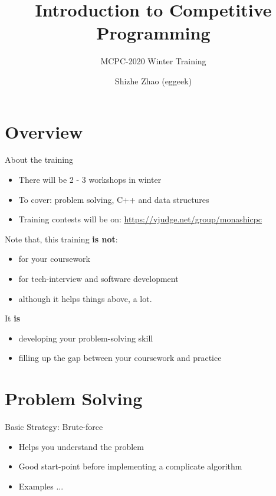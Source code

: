 \documentclass{beamer}
\title[Introduction to Competitive Programming]{
Introduction to Competitive Programming
}
\subtitle {MCPC-2020 Winter Training}
\date{}
\author[Shizhe Zhao (eggeek)]{
  Shizhe Zhao (eggeek)
}
\begin{document}

\frame{\titlepage}
\section[]{}

\section{Overview}
\begin{frame}{About the training}
  \begin{itemize}
    \item There will be 2 - 3 workshops in winter
    \item To cover: problem solving, C++ and data structures
    \item Training contests will be on: \url{https://vjudge.net/group/monashicpc}
  \end{itemize}
  Note that, this training \textbf{is not}:
  \begin{itemize}
    \item for your coursework
    \item for tech-interview and software development
    \item although it helps things above, a lot.
  \end{itemize}
  It \textbf{is}
  \begin{itemize}
    \item developing your problem-solving skill
    \item filling up the gap between your coursework and practice
  \end{itemize}
\end{frame}

\section{Problem Solving}
\begin{frame}{Basic Strategy: Brute-force}
  \begin{itemize}
    \item Helps you understand the problem
    \item Good start-point before implementing a complicate algorithm
    \item Examples ...
  \end{itemize}
\end{frame}
\end{document}
